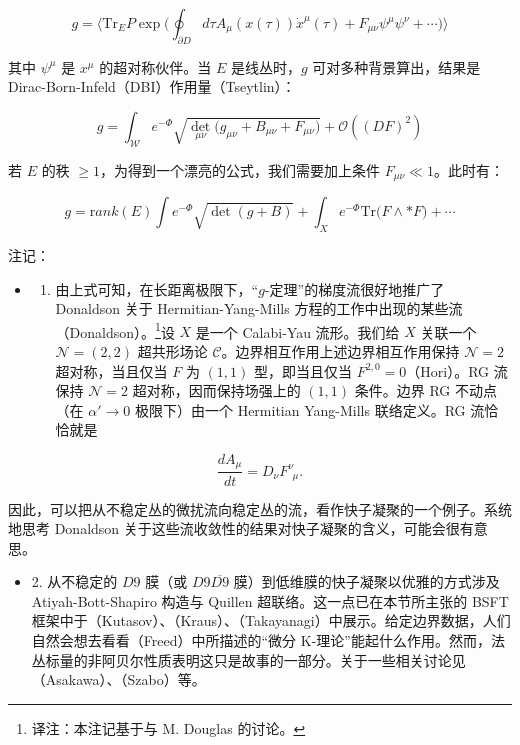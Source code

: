 \documentclass[11pt,a4paper]{ctexart}
\newcommand{\TN}[1]{\footnote{译注：#1}}
\begin{document}
\[g = \bigl\langle {\mathrm{Tr}}_E P\exp\biggl( \oint_{\partial D} d\tau  A_\mu(x(\tau)) \dot x^\mu(\tau)
+F_{\mu\nu} \psi^\mu \psi^\nu
+ \cdots \biggr) \bigr\rangle\]

其中 \(\psi^\mu\) 是 \(x^\mu\) 的超对称伙伴。当 \(E\) 是线丛时，\(g\) 可对多种背景算出，结果是 Dirac-Born-Infeld（DBI）作用量（Tseytlin）：

\[g =\int_{{\mathcal W}} e^{-\Phi} \sqrt{\det_{\mu\nu} \bigl( g_{\mu\nu} +  B_{\mu\nu} + F_{\mu\nu}\bigr)} +
{\mathcal O}((DF)^2)\]

若 \(E\) 的秩 \(\geq 1\)，为得到一个漂亮的公式，我们需要加上条件 \(F_{\mu\nu} \ll 1\)。此时有：

\[g = {\mathrm rank}(E) \int e^{-\Phi} \sqrt{\det(g+B)} + \int_X  e^{-\Phi} {\mathrm{Tr}}  \bigl(F\wedge * F \bigr) + \cdots\]

注记：

\begin{itemize}
\tightlist
\item
  \begin{enumerate}
  \def\labelenumi{\arabic{enumi}.}
  \tightlist
  \item
    由上式可知，在长距离极限下，``\(g\)-定理''的梯度流很好地推广了 Donaldson 关于 Hermitian-Yang-Mills 方程的工作中出现的某些流（Donaldson）。\TN{本注记基于与 M. Douglas 的讨论。}设 \(X\) 是一个 Calabi-Yau 流形。我们给 \(X\) 关联一个 \({\mathcal N} = (2,2)\) 超共形场论 \({\mathcal C}\)。边界相互作用上述边界相互作用保持 \({\mathcal N}=2\) 超对称，当且仅当 \(F\) 为 \((1,1)\) 型，即当且仅当 \(F^{2,0}=0\)（Hori）。RG 流保持 \({\mathcal N}=2\) 超对称，因而保持场强上的 \((1,1)\) 条件。边界 RG 不动点（在 \(\alpha' \to 0\) 极限下）由一个 Hermitian Yang-Mills 联络定义。RG 流恰恰就是
  \end{enumerate}
\end{itemize}

\[\frac{dA_\mu}{dt} = D_\nu F^{\nu}_{~~\mu}.\]

因此，可以把从不稳定丛的微扰流向稳定丛的流，看作快子凝聚的一个例子。系统地思考 Donaldson 关于这些流收敛性的结果对快子凝聚的含义，可能会很有意思。

\begin{itemize}
\tightlist
\item
  2. 从不稳定的 \(D9\) 膜（或 \(D9\overline{D9}\) 膜）到低维膜的快子凝聚以优雅的方式涉及 Atiyah-Bott-Shapiro 构造与 Quillen 超联络。这一点已在本节所主张的 BSFT 框架中于（Kutasov）、（Kraus）、（Takayanagi）中展示。给定边界数据，人们自然会想去看看（Freed）中所描述的``微分 K-理论''能起什么作用。然而，法丛标量的非阿贝尔性质表明这只是故事的一部分。关于一些相关讨论见（Asakawa）、（Szabo）等。
\end{itemize}
\end{document}
